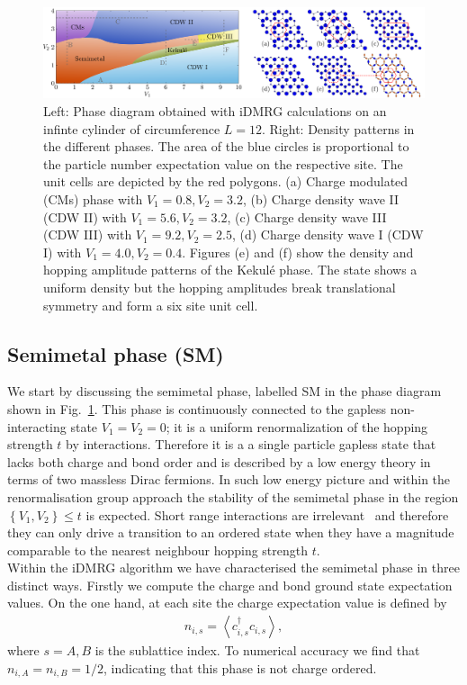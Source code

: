 \documentclass[aps,prx,10pt,twocolumn,floatfix,superscriptaddress,showpacs,numerical,footinbib]{revtex4-1}
\begin{document}
\begin{figure}
 \includegraphics[width=\textwidth]{pdf/phase_diagram_ext.pdf}
 \caption{Left: Phase diagram obtained with iDMRG calculations on an infinte cylinder of circumference $L=12$. 
 Right: Density patterns in the different phases. 
 The area of the blue circles is proportional to the particle number expectation value on the respective site. 
 The unit cells are depicted by the red polygons. 
 (a) Charge modulated (CMs) phase with $V_1 = 0.8, V_2 = 3.2 $, (b) Charge density wave II (CDW II) with $V_1 = 5.6, V_2 = 3.2$,  (c) Charge density wave III (CDW III) with $V_1 = 9.2, V_2 = 2.5$, (d) Charge density wave I (CDW I) with $V_1 = 4.0, V_2 = 0.4 $. 
 Figures (e) and (f) show the density and hopping amplitude patterns of the Kekul\'e phase. 
 The state shows a uniform density but the hopping amplitudes break translational symmetry and form a six site unit cell. \label{fig:phase diagram}}
\end{figure}




%
\subsection{Semimetal phase (SM)}
%
We start by discussing the semimetal phase, labelled SM in the phase diagram shown in Fig.~\ref{fig:phase diagram}.
%
This phase is continuously connected to the gapless non-interacting state $V_{1}=V_{2}=0$; 
it is a uniform renormalization of the hopping strength $t$ by interactions.
%
Therefore it is a a single particle gapless state that lacks both charge and bond order and is described by a low energy theory in terms of two massless Dirac fermions.
%
In such low energy picture and within the renormalisation group approach the stability of the semimetal phase in the region $\left\lbrace V_{1},V_{2}\right\rbrace \leq t$ is expected.
%
Short range interactions are irrelevant~\cite{S94} and therefore they can only drive a transition to an ordered state when they have a magnitude comparable to the nearest neighbour hopping strength $t$.\\
%

%
Within the iDMRG algorithm we have characterised the semimetal phase in three distinct ways.
%
Firstly we compute the charge and bond ground state expectation values.
%
On the one hand, at each site the charge expectation value is defined by 
%
\begin{eqnarray}
\label{eq:charge}
n_{i,s}=\left\langle c^{\dagger}_{i,s}c_{i,s}\right\rangle,  
\end{eqnarray}
%
where $s=A,B$ is the sublattice index.
%
To numerical accuracy we find that $n_{i,A}=n_{i,B}=1/2$, indicating that this phase is not charge ordered.
%
\end{document}
